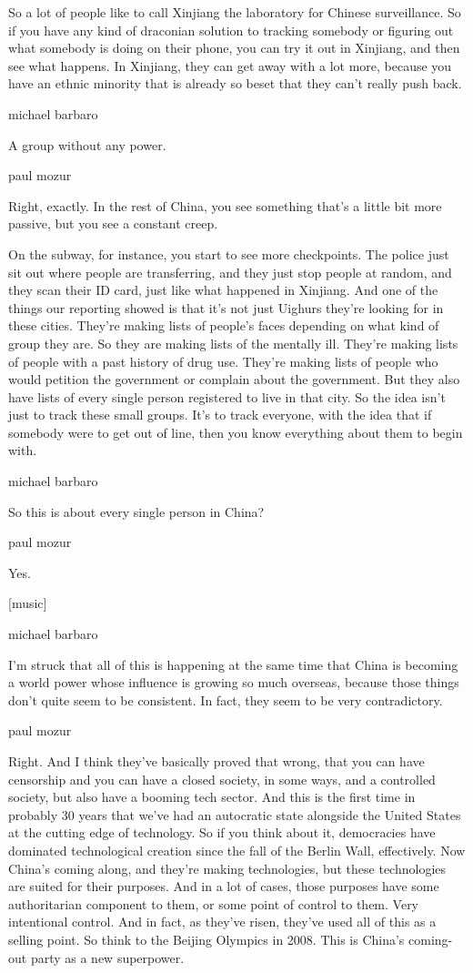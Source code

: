 So a lot of people like to call Xinjiang the laboratory for Chinese
surveillance. So if you have any kind of draconian solution to tracking
somebody or figuring out what somebody is doing on their phone, you can
try it out in Xinjiang, and then see what happens. In Xinjiang, they can
get away with a lot more, because you have an ethnic minority that is
already so beset that they can't really push back.

michael barbaro

A group without any power.

paul mozur

Right, exactly. In the rest of China, you see something that's a little
bit more passive, but you see a constant creep.

On the subway, for instance, you start to see more checkpoints. The
police just sit out where people are transferring, and they just stop
people at random, and they scan their ID card, just like what happened
in Xinjiang. And one of the things our reporting showed is that it's not
just Uighurs they're looking for in these cities. They're making lists
of people's faces depending on what kind of group they are. So they are
making lists of the mentally ill. They're making lists of people with a
past history of drug use. They're making lists of people who would
petition the government or complain about the government. But they also
have lists of every single person registered to live in that city. So
the idea isn't just to track these small groups. It's to track everyone,
with the idea that if somebody were to get out of line, then you know
everything about them to begin with.

michael barbaro

So this is about every single person in China?

paul mozur

Yes.

{[}music{]}

michael barbaro

I'm struck that all of this is happening at the same time that China is
becoming a world power whose influence is growing so much overseas,
because those things don't quite seem to be consistent. In fact, they
seem to be very contradictory.

paul mozur

Right. And I think they've basically proved that wrong, that you can
have censorship and you can have a closed society, in some ways, and a
controlled society, but also have a booming tech sector. And this is the
first time in probably 30 years that we've had an autocratic state
alongside the United States at the cutting edge of technology. So if you
think about it, democracies have dominated technological creation since
the fall of the Berlin Wall, effectively. Now China's coming along, and
they're making technologies, but these technologies are suited for their
purposes. And in a lot of cases, those purposes have some authoritarian
component to them, or some point of control to them. Very intentional
control. And in fact, as they've risen, they've used all of this as a
selling point. So think to the Beijing Olympics in 2008. This is China's
coming-out party as a new superpower.

